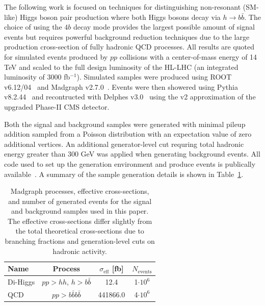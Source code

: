 The following work is focused on techniques for distinguishing non-resonant (SM-like) Higgs boson pair production where both Higgs bosons decay via $h \to b \bar{b}$. The choice of using the $4b$ decay mode provides the largest possible amount of signal events but requires powerful background reduction techniques due to the large production cross-section of fully hadronic QCD processes. All results are quoted for simulated events produced by $pp$ collisions with a center-of-mass energy of 14 TeV and scaled to the full design luminosity of the HL-LHC (an integrated luminosity of 3000 fb$^{-1}$). Simulated samples were produced using ROOT v6.12/04~\cite{Brun:1997pa} and Madgraph v2.7.0~\cite{Alwall:2014hca}. Events were then showered using Pythia v8.2.44~\cite{Sj_strand_2015} and recontructed with Delphes v3.0~\cite{de_Favereau_2014} using the v2 approximation of the upgraded Phase-II CMS detector.

Both the signal and background samples were generated with minimal pileup addition sampled from a Poisson distribution with an expectation value of zero additional vertices. An additional generator-level cut requring total hadronic energy greater than 300 GeV was applied when generating background events. All code used to set up the generation environment and produce events is publically available~\cite{github}. A summary of the sample generation details is shown in Table~\ref{tab:samples}.

\begin{table}[ht!]
 \label{tab:samples}
\centering
    \begin{tabular}{|l|c|c|c|} %
      \hline\hline
      Name & Process & $\sigma_{\textrm{eff}}$ [fb] & $N_{\textrm{events}}$ \\
      \hline
      Di-Higgs & $p p > h h$, $h > b \bar{b}$ & 12.4 & 1$\cdot 10^6$ \\
      QCD     & $p p > b \bar{b} b \bar{b}$ & 441866.0 & 4$\cdot 10^6$ \\
      \hline\hline
    \end{tabular}
\caption{Madgraph processes, effective cross-sections, and number of generated events for the signal and background samples used in this paper. The effective cross-sections differ slightly from the total theoretical cross-sections due to branching fractions and generation-level cuts on hadronic activity.}
\end{table}

